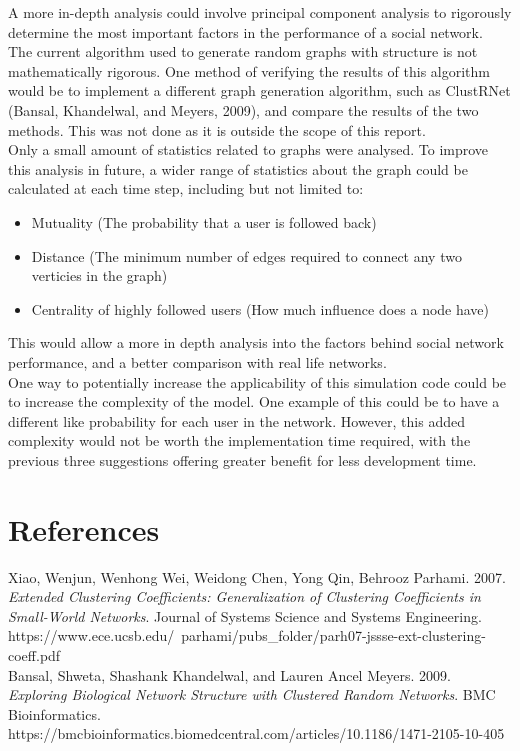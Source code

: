\documentclass{article}
\begin{document}
A more in-depth analysis could involve principal component analysis to rigorously
determine the most important factors in the performance of a social network.\\

The current algorithm used to generate random graphs with structure is not mathematically rigorous.
One method of verifying the results of this algorithm would be to implement a different
graph generation algorithm, such as ClustRNet (Bansal, Khandelwal, and Meyers, 2009),
and compare the results of the two methods. This was not done
as it is outside the scope of this report.\\

Only a small amount of statistics related to graphs were analysed. To improve this
analysis in future, a wider range of statistics about the graph could be calculated at each time step,
including but not limited to:
\begin{itemize}
\item Mutuality (The probability that a user is followed back)
\item Distance (The minimum number of edges required to connect any two verticies in the graph)
\item Centrality of highly followed users (How much influence does a node have)
\end{itemize}
This would allow a more in depth analysis into the factors behind social network performance, and a better
comparison with real life networks.\\

One way to potentially increase the applicability of this simulation code could
be to increase the complexity of the model. One example of this could be to 
have a different like probability for each user in the network.
However, this added complexity would not be worth the implementation time required,
with the previous three suggestions offering greater benefit for less development
time.

\section{References}
Xiao, Wenjun, Wenhong Wei, Weidong Chen, Yong Qin, Behrooz Parhami. 2007.
\textit{Extended Clustering Coefficients: Generalization of Clustering Coefficients in Small-World
Networks}. Journal of Systems Science and Systems Engineering. https://www.ece.ucsb.edu/~parhami/pubs\_folder/parh07-jssse-ext-clustering-coeff.pdf\\

Bansal, Shweta, Shashank Khandelwal, and Lauren Ancel Meyers. 2009. \textit{Exploring Biological Network Structure with Clustered Random Networks}.
BMC Bioinformatics. https://bmcbioinformatics.biomedcentral.com/articles/10.1186/1471-2105-10-405
\end{document}
